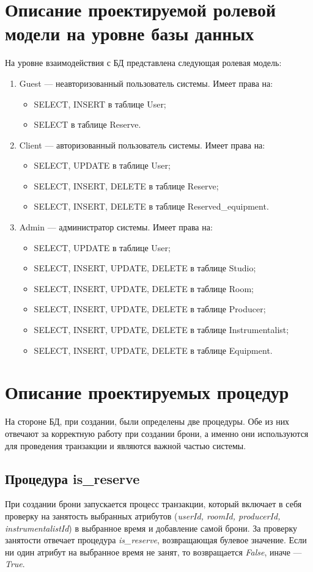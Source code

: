 \section{Описание проектируемой ролевой модели на уровне базы данных}
На уровне взаимодействия с БД представлена следующая ролевая модель:
\begin{enumerate}
	\item Guest --- неавторизованный пользователь системы. Имеет права на:
	\begin{itemize}
		\item SELECT, INSERT в таблице User;
		\item SELECT в таблице Reserve.
	\end{itemize}
	\item Client --- авторизованный пользователь системы. Имеет права на:
	\begin{itemize}
		\item SELECT, UPDATE в таблице User;
		\item SELECT, INSERT, DELETE в таблице Reserve;
		\item SELECT, INSERT, DELETE в таблице Reserved\_equipment.
	\end{itemize}
	\item Admin --- администратор системы. Имеет права на:
	\begin{itemize}
	\item SELECT, UPDATE в таблице User;
	\item SELECT, INSERT, UPDATE, DELETE в таблице Studio;
	\item SELECT, INSERT, UPDATE, DELETE в таблице Room;
	\item SELECT, INSERT, UPDATE, DELETE в таблице Producer;
	\item SELECT, INSERT, UPDATE, DELETE в таблице Instrumentalist;
	\item SELECT, INSERT, UPDATE, DELETE в таблице Equipment.
	\end{itemize}
\end{enumerate} 

\section{Описание проектируемых процедур}

На стороне БД, при создании, были определены две процедуры.
Обе из них отвечают за корректную работу при создании брони, а именно они используются для проведения транзакции и являются важной частью системы.

\subsection{Процедура is\_reserve}
При создании брони запускается процесс транзакции, который включает в себя проверку на занятость выбранных атрибутов (\textit{userId, roomId, producerId, instrumentalistId}) в выбранное время и добавление самой брони.
За проверку занятости отвечает процедура \textit{is\_reserve}, возвращающая булевое значение.
Если ни один атрибут на выбранное время не занят, то возвращается \textit{False}, иначе --- \textit{True}.

